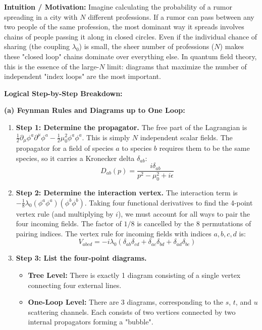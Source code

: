 \begin{solution}
\textbf{Intuition / Motivation:}
Imagine calculating the probability of a rumor spreading in a city with $N$ different professions. If a rumor can pass between any two people of the same profession, the most dominant way it spreads involves chains of people passing it along in closed circles. Even if the individual chance of sharing (the coupling $\lambda_0$) is small, the sheer number of professions ($N$) makes these "closed loop" chains dominate over everything else. In quantum field theory, this is the essence of the large-$N$ limit: diagrams that maximize the number of independent "index loops" are the most important.

\textbf{Logical Step-by-Step Breakdown:}

\textbf{(a) Feynman Rules and Diagrams up to One Loop:}
\begin{enumerate}
    \item \textbf{Step 1: Determine the propagator.}
    The free part of the Lagrangian is $\frac{1}{2} \partial_\mu \phi^a \partial^\mu \phi^a - \frac{1}{2} \mu_0^2 \phi^a \phi^a$. This is simply $N$ independent scalar fields. The propagator for a field of species $a$ to species $b$ requires them to be the same species, so it carries a Kronecker delta $\delta_{ab}$:
    \[ D_{ab}(p) = \frac{i \delta_{ab}}{p^2 - \mu_0^2 + i\epsilon} \]
    
    \item \textbf{Step 2: Determine the interaction vertex.}
    The interaction term is $-\frac{1}{8} \lambda_0 (\phi^a \phi^a)(\phi^b \phi^b)$.
    Taking four functional derivatives to find the 4-point vertex rule (and multiplying by $i$), we must account for all ways to pair the four incoming fields. The factor of $1/8$ is cancelled by the $8$ permutations of pairing indices. The vertex rule for incoming fields with indices $a, b, c, d$ is:
    \[ V_{abcd} = -i \lambda_0 (\delta_{ab}\delta_{cd} + \delta_{ac}\delta_{bd} + \delta_{ad}\delta_{bc}) \]
    
    \item \textbf{Step 3: List the four-point diagrams.}
    \begin{itemize}
        \item \textbf{Tree Level:} There is exactly 1 diagram consisting of a single vertex connecting four external lines.
        \item \textbf{One-Loop Level:} There are 3 diagrams, corresponding to the $s$, $t$, and $u$ scattering channels. Each consists of two vertices connected by two internal propagators forming a "bubble".
    \end{itemize}
\end{enumerate}


\end{solution}
